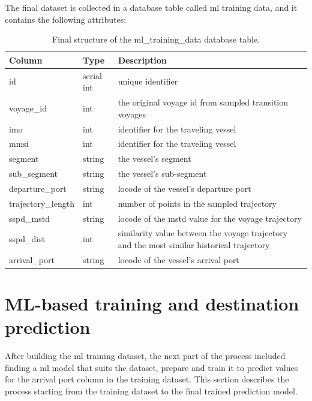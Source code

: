 The final dataset is collected in a database table called \acrshort{ml} training data, and it contains the following attributes:

\begin{table}[htbp]
    \centering
    \small{\begin{tabularx}{1.0\textwidth}{p{1.0in} p{0.75in} X}
        \bfseries{Column} & \bfseries{Type} & \bfseries{Description} \\ \toprule
        id & serial int & unique identifier \\ \midrule
        voyage\_id & int & the original voyage id from sampled transition voyages \\ \midrule
        imo & int & identifier for the traveling vessel\\ \midrule
        mmsi & int & identifier for the traveling vessel\\ \midrule
        segment & string & the vessel's segment \\ \midrule
        sub\_segment & string & the vessel's sub-segment \\ \midrule
        departure\_port & string & \gls{locode} of the vessel's departure port \\ \midrule
        trajectory\_length & int & number of points in the sampled trajectory \\ \midrule
        sspd\_mstd & string & \gls{locode} of the \acrshort{mstd} value for the voyage trajectory \\ \midrule
        sspd\_dist & int & similarity value between the voyage trajectory and the most similar historical trajectory   \\ \midrule
        arrival\_port & string & \gls{locode} of the vessel's arrival port \\ \bottomrule
    \end{tabularx}}
\caption{Final structure of the ml\_training\_data database table.}\label{tab:ml_training_data}
\end{table}

\section{ML-based training and destination prediction}

After building the \acrfull{ml} training dataset, the next part of the process included finding a \acrshort{ml} model that suits the dataset, prepare and train it to predict values for the arrival port column in the training dataset. This section describes the process starting from the training dataset to the final trained prediction model.

